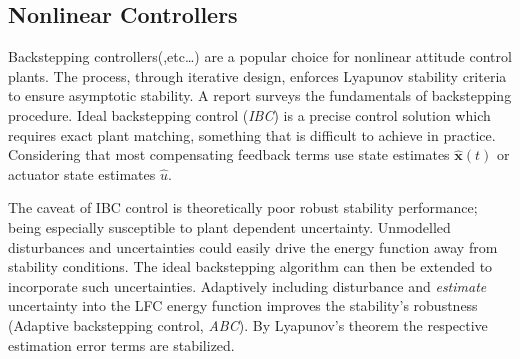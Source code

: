 {\subsection{Nonlinear Controllers}
\label{subsec:control.attitude.nonlinear}
Backstepping controllers(\cite{satellitebackstepping,intelligentbackstep,backstepslidingmode},etc\ldots) are a popular choice for nonlinear attitude control plants. The process, through iterative design, enforces Lyapunov stability criteria to ensure asymptotic stability. A report \cite{backstepping} surveys the fundamentals of backstepping procedure. Ideal backstepping control (\emph{IBC}) is a precise control solution which requires exact plant matching, something that is difficult to achieve in practice. Considering that most compensating feedback terms use state estimates $\hat{\mathbf{x}}(t)$ or actuator state estimates $\hat{u}$. 
\par
The caveat of IBC control is theoretically poor robust stability performance; being especially susceptible to plant dependent uncertainty. Unmodelled disturbances and uncertainties could easily drive the energy function away from stability conditions. The ideal backstepping algorithm can then be extended to incorporate such uncertainties. Adaptively including disturbance and \emph{estimate} uncertainty into the LFC energy function improves the stability's robustness (Adaptive backstepping control, \emph{ABC}). By Lyapunov's theorem the respective estimation error terms are stabilized.
}
